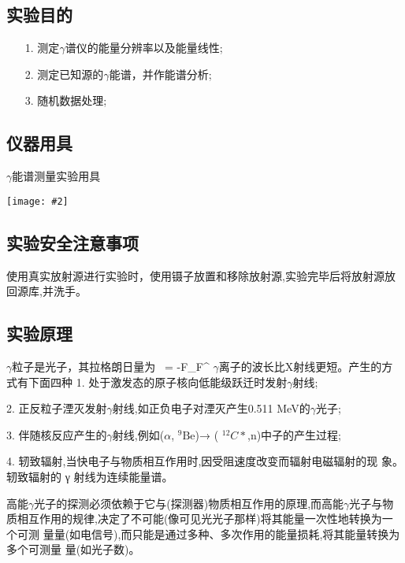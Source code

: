 \documentclass[11pt,a4paper]{ctexart}
\newcommand{\cpic}[2]{
\begin{center}
\texttt{[image: \#2]}
\end{center}
}
\begin{document}
\subsection{实验目的}
\begin{enumerate}
 \item[1.]测定$\gamma$谱仪的能量分辨率以及能量线性;
  \item[2.]测定已知源的$\gamma$能谱，并作能谱分析;
  \item[3.]随机数据处理;
\end{enumerate}


\subsection{仪器用具}
\begin{table}[H]
  \caption{$\gamma$能谱测量实验用具}
\cpic{0.4}{t1}
\end{table}

\subsection{实验安全注意事项}

使用真实放射源进行实验时，使用镊子放置和移除放射源,实验完毕后将放射源放回源库,并洗手。

\subsection{实验原理}
$\gamma$粒子是光子，其拉格朗日量为~\cite{electromagnetic}
\beq
{} = -F_{\mu\nu}F^{\mu\nu}
\eeq
$\gamma$离子的波长比X射线更短。产生的方式有下面四种
1. 处于激发态的原子核向低能级跃迁时发射$\gamma$射线;

2. 正反粒子湮灭发射$\gamma$射线,如正负电子对湮灭产生0.511 MeV的$\gamma$光子;

3. 伴随核反应产生的$\gamma$射线,例如($\alpha$, $^{9}\mathrm{Be}$)→ ( $^{12}C*$,n)中子的产生过程;

4. 轫致辐射,当快电子与物质相互作用时,因受阻速度改变而辐射电磁辐射的现
象。轫致辐射的 γ 射线为连续能量谱。

高能$\gamma$光子的探测必须依赖于它与(探测器)物质相互作用的原理,而高能$\gamma$光子与物质相互作用的规律,决定了不可能(像可见光光子那样)将其能量一次性地转换为一个可测
量量(如电信号),而只能是通过多种、多次作用的能量损耗,将其能量转换为多个可测量
量(如光子数)。
\end{document}
